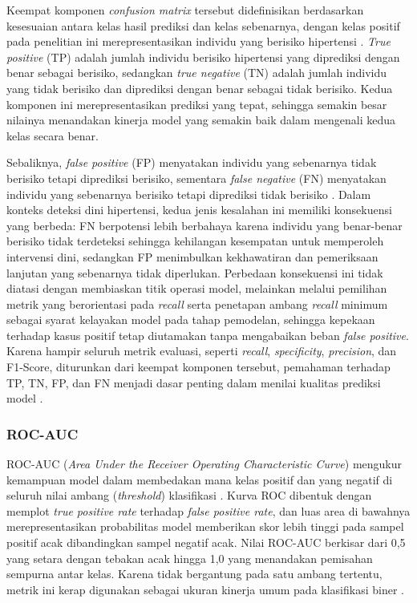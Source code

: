 Keempat komponen \emph{confusion matrix} tersebut didefinisikan berdasarkan kesesuaian antara kelas hasil prediksi dan kelas sebenarnya, dengan kelas positif pada penelitian ini merepresentasikan individu yang berisiko hipertensi \autocite{Fawcett2006Introduction}. \emph{True positive} (TP) adalah jumlah individu berisiko hipertensi yang diprediksi dengan benar sebagai berisiko, sedangkan \emph{true negative} (TN) adalah jumlah individu yang tidak berisiko dan diprediksi dengan benar sebagai tidak berisiko. Kedua komponen ini merepresentasikan prediksi yang tepat, sehingga semakin besar nilainya menandakan kinerja model yang semakin baik dalam mengenali kedua kelas secara benar.

Sebaliknya, \emph{false positive} (FP) menyatakan individu yang sebenarnya tidak berisiko tetapi diprediksi berisiko, sementara \emph{false negative} (FN) menyatakan individu yang sebenarnya berisiko tetapi diprediksi tidak berisiko \autocite{Sokolova2009Systematic}. Dalam konteks deteksi dini hipertensi, kedua jenis kesalahan ini memiliki konsekuensi yang berbeda: FN berpotensi lebih berbahaya karena individu yang benar-benar berisiko tidak terdeteksi sehingga kehilangan kesempatan untuk memperoleh intervensi dini, sedangkan FP menimbulkan kekhawatiran dan pemeriksaan lanjutan yang sebenarnya tidak diperlukan. Perbedaan konsekuensi ini tidak diatasi dengan membiaskan titik operasi model, melainkan melalui pemilihan metrik yang berorientasi pada \emph{recall} serta penetapan ambang \emph{recall} minimum sebagai syarat kelayakan model pada tahap pemodelan, sehingga kepekaan terhadap kasus positif tetap diutamakan tanpa mengabaikan beban \emph{false positive}. Karena hampir seluruh metrik evaluasi, seperti \emph{recall}, \emph{specificity}, \emph{precision}, dan F1-Score, diturunkan dari keempat komponen tersebut, pemahaman terhadap TP, TN, FP, dan FN menjadi dasar penting dalam menilai kualitas prediksi model \autocite{Sokolova2009Systematic}.

\subsubsection{ROC-AUC}
ROC-AUC (\emph{Area Under the Receiver Operating Characteristic Curve}) mengukur kemampuan model dalam membedakan mana kelas positif dan yang negatif di seluruh nilai ambang (\emph{threshold}) klasifikasi \autocite{Fawcett2006Introduction}. Kurva ROC dibentuk dengan memplot \emph{true positive rate} terhadap \emph{false positive rate}, dan luas area di bawahnya merepresentasikan probabilitas model memberikan skor lebih tinggi pada sampel positif acak dibandingkan sampel negatif acak. Nilai ROC-AUC berkisar dari 0,5 yang setara dengan tebakan acak hingga 1,0 yang menandakan pemisahan sempurna antar kelas. Karena tidak bergantung pada satu ambang tertentu, metrik ini kerap digunakan sebagai ukuran kinerja umum pada klasifikasi biner \autocite{Fawcett2006Introduction}.

